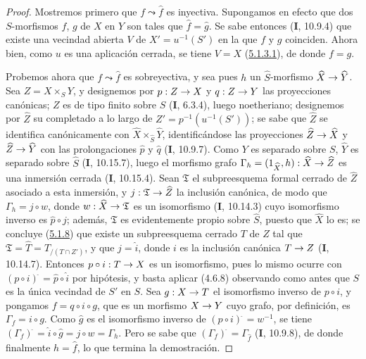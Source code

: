\documentclass[10pt,oneside,openany]{book}
\theoremstyle{egaenv}\newtheorem*{env}{---}
\theoremstyle{egastatement}
\theoremstyle{egadescription}
\newcommand{\oldpage}[2][]{\marginnote{\normalfont\scriptsize\textbf{#1}\,|\,#2}\ignorespaces}
\renewcommand{\to}{\mathchoice{\longrightarrow}{\rightarrow}{\rightarrow}{\rightarrow}}
\begin{document}
\begin{proof}
Mostremos primero que $f\leadsto\widehat f$ es inyectiva. Supongamos en efecto que dos
$S$-morfismos $f$, $g$ de $X$ en $Y$ son tales que $\widehat f=\widehat g$.
Se sabe entonces (\textbf{I}, 10.9.4) que existe una vecindad abierta $V$ de
$X'=u^{-1}(S')$ en la que $f$ y $g$ coinciden. Ahora bien, como $u$ es una aplicación
cerrada, se tiene $V=X$ (\hyperref[III.5.1.3.1-fr]{5.1.3.1}), de donde $f=g$.

Probemos ahora que $f\leadsto\widehat f$ es sobreyectiva, y sea pues $h$ un
$\widehat S$-morfismo $\widehat X\to\widehat Y$. Sea $Z=X\times_S Y$, y
designemos por $p:Z\to X$ y $q:Z\to Y$ las proyecciones canónicas; $Z$ es de
tipo finito sobre $S$ (\textbf{I}, 6.3.4), luego noetheriano; designemos por $\widehat Z$ su
completado a lo largo de $Z'=p^{-1}(u^{-1}(S'))$; se sabe que $\widehat Z$ se identifica
canónicamente con $\widehat X\times_{\widehat S}\widehat Y$, identificándose las proyecciones
$\widehat Z\to\widehat X$ y $\widehat Z\to\widehat Y$ con las
prolongaciones $\widehat p$ y $\widehat q$ (\textbf{I}, 10.9.7). Como $Y$ es separado sobre
$S$, $\widehat Y$ es separado sobre $\widehat S$ (\textbf{I}, 10.15.7), luego el morfismo
grafo
$\Gamma_h=(1_{\widehat X},h):\widehat X\to\widehat Z$
es una inmersión cerrada (\textbf{I}, 10.15.4). Sean $\mathfrak T$ el subpreesquema
formal cerrado de $\widehat Z$ asociado a esta inmersión, y
$j:\mathfrak T\to\widehat Z$ la inclusión canónica, de modo que
$\Gamma_h=j\circ w$, donde $w:\widehat X\to\mathfrak T$ es un isomorfismo
(\textbf{I}, 10.14.3) cuyo isomorfismo inverso es $\widehat p\circ j$; además,
$\mathfrak T$ es evidentemente propio sobre $\widehat S$, puesto que $\widehat X$ lo es;
se concluye (\hyperref[III.5.1.8-fr]{5.1.8}) que existe un subpreesquema
cerrado $T$ de $Z$ tal que
$\mathfrak T=\widehat T=T_{/(T\cap Z')}$, y que $j=\widehat i$, donde $i$ es
la inclusión canónica $T\to Z$ (\textbf{I}, 10.14.7). Entonces $p\circ i:T\to X$ es un
isomorfismo, pues lo mismo ocurre con
$(p\circ i)^{\widehat{\,}}=\widehat p\circ\widehat i$ por hipótesis, y basta
aplicar
\oldpage[III]{157}
(4.6.8) observando como antes que $S$ es la única vecindad de $S'$ en $S$.
Sea $g:X\to T$ el isomorfismo inverso de $p\circ i$, y pongamos
$f=q\circ i\circ g$, que es un morfismo $X\to Y$ cuyo grafo, por definición, es
$\Gamma_f=i\circ g$. Como $\widehat g$ es el isomorfismo inverso de
$(p\circ i)^{\widehat{\,}}=w^{-1}$, se tiene
$(\Gamma_f)^{\widehat{\,}}=\widehat i\circ\widehat g=j\circ w=\Gamma_h$.
Pero se sabe que $(\Gamma_f)^{\widehat{\,}}=\Gamma_{\widehat f}$ (\textbf{I}, 10.9.8), de donde
finalmente $h=\widehat f$, lo que termina la demostración.
\end{proof}
\end{document}
